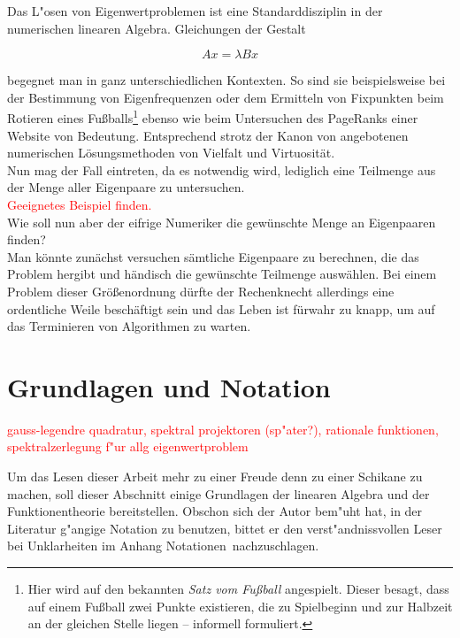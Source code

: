 Das L"osen von Eigenwertproblemen ist eine Standarddisziplin in der
numerischen linearen Algebra. Gleichungen der Gestalt

\begin{equation}\label{eq:eigenproblem}
Ax = \lambda Bx
\end{equation}

begegnet man in ganz unterschiedlichen Kontexten. So sind sie beispielsweise
bei der Bestimmung von Eigenfrequenzen oder dem Ermitteln von Fixpunkten beim
Rotieren eines Fußballs\footnote{Hier wird auf den bekannten
\emph{Satz vom Fußball} angespielt. Dieser besagt, dass auf einem Fußball
zwei Punkte existieren, die zu Spielbeginn und zur Halbzeit
an der gleichen Stelle liegen -- informell formuliert.} ebenso wie beim
Untersuchen des PageRanks einer Website von
Bedeutung. Entsprechend strotz der Kanon von angebotenen numerischen
Lösungsmethoden von Vielfalt und Virtuosität.\\

Nun mag der Fall eintreten, da es notwendig wird, lediglich eine Teilmenge
aus der Menge aller Eigenpaare zu untersuchen.\\
\textcolor{red}{Geeignetes Beispiel finden.}\\

Wie soll nun aber der eifrige Numeriker die gewünschte Menge an Eigenpaaren
finden?\\

Man könnte zunächst versuchen sämtliche Eigenpaare zu berechnen, die das Problem
hergibt und händisch die gewünschte Teilmenge auswählen. Bei einem Problem
dieser Größenordnung dürfte der Rechenknecht allerdings eine ordentliche Weile
beschäftigt sein und das Leben ist fürwahr zu knapp, um auf das Terminieren
von Algorithmen zu warten.\\

\section{Grundlagen und Notation}

\textcolor{red}{gauss-legendre quadratur, spektral projektoren (sp"ater?), rationale funktionen, spektralzerlegung f"ur allg eigenwertproblem}

Um das Lesen dieser Arbeit mehr zu einer Freude denn zu einer Schikane zu
machen, soll dieser Abschnitt einige Grundlagen der linearen Algebra und
der Funktionentheorie bereitstellen. Obschon sich der Autor bem"uht hat,
in der Literatur g"angige Notation zu benutzen, bittet er den
verst"andnissvollen Leser bei Unklarheiten im Anhang \glqq Notationen\grqq\
nachzuschlagen.\\

